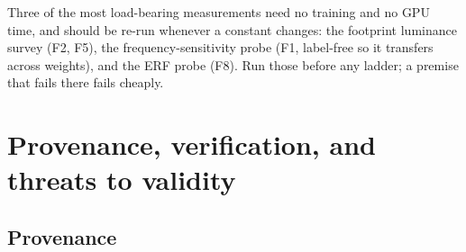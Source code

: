 \documentclass[11pt,a4paper]{article}
\begin{document}
Three of the most load-bearing measurements need no training and no GPU
time, and should be re-run whenever a constant changes: the footprint
luminance survey (F2, F5), the frequency-sensitivity probe (F1, label-free
so it transfers across weights), and the ERF probe (F8). Run those before
any ladder; a premise that fails there fails cheaply.

\section{Provenance, verification, and threats to validity}

\subsection{Provenance}
\end{document}
